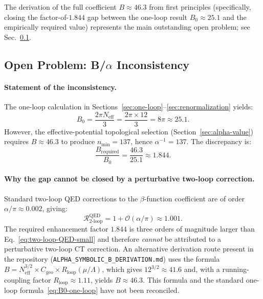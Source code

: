 \documentclass[11pt,a4paper]{article}
\theoremstyle{remark}
\begin{document}
The derivation of the full coefficient $B \approx 46.3$ from first principles (specifically, closing the factor-of-$1.844$ gap between the one-loop result $B_0 \approx 25.1$ and the empirically required value) represents the main outstanding open problem; see Sec.~\ref{sec:B-alpha-inconsistency}.

\subsection{Open Problem: B/\texorpdfstring{$\alpha$}{alpha} Inconsistency}
\label{sec:B-alpha-inconsistency}


\paragraph{Statement of the inconsistency.}
The one-loop calculation in Sections~\ref{sec:one-loop}--\ref{sec:renormalization} yields:
\begin{equation}
B_0 = \frac{2\pi N_{\mathrm{eff}}}{3} = \frac{2\pi \times 12}{3} = 8\pi \approx 25.1.
\label{eq:B0-one-loop}
\end{equation}
However, the effective-potential topological selection (Section~\ref{sec:alpha-value}) requires $B \approx 46.3$ to produce $n_{\min} = 137$, hence $\alpha^{-1} = 137$. The discrepancy is:
\begin{equation}
\frac{B_{\mathrm{required}}}{B_0} = \frac{46.3}{25.1} \approx 1.844.
\label{eq:B-ratio}
\end{equation}

\paragraph{Why the gap cannot be closed by a perturbative two-loop correction.}
Standard two-loop QED corrections to the $\beta$-function coefficient are of order $\alpha/\pi \approx 0.002$, giving:
\begin{equation}
\mathcal{R}_{\mathrm{2\text{-}loop}}^{\mathrm{QED}} = 1 + \mathcal{O}(\alpha/\pi) \approx 1.001.
\label{eq:two-loop-QED-small}
\end{equation}
The required enhancement factor $1.844$ is three orders of magnitude larger than Eq.~\eqref{eq:two-loop-QED-small} and therefore \emph{cannot} be attributed to a perturbative two-loop CT correction. An alternative derivation route present in the repository (\texttt{ALPHA\_SYMBOLIC\_B\_DERIVATION.md}) uses the formula $B = N_{\mathrm{eff}}^{3/2} \times C_{\mathrm{geo}} \times R_{\mathrm{loop}}(\mu/\Lambda)$, which gives $12^{3/2} \approx 41.6$ and, with a running-coupling factor $R_{\mathrm{loop}} \approx 1.11$, yields $B \approx 46.3$. This formula and the standard one-loop formula~\eqref{eq:B0-one-loop} have not been reconciled.
\end{document}
